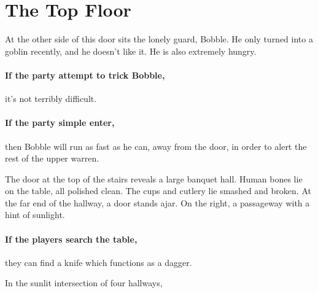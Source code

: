 \section{The Top Floor}
\label{upper}

\setcounter{list}{0}

\begin{multicols}{2}



At the other side of this door sits the lonely guard, Bobble.
He only turned into a goblin recently, and he doesn't like it.
He is also extremely hungry.

\paragraph{If the party attempt to trick Bobble,}
it's not terribly difficult.

\paragraph{If the party simple enter,}
then Bobble will run as fast as he can, away from the door, in order to alert the rest of the upper warren.



\begin{boxtext}

	The door at the top of the stairs reveals a large banquet hall.
	Human bones lie on the table, all polished clean.
	The cups and cutlery lie smashed and broken.
	At the far end of the hallway, a door stands ajar.
	On the right, a passageway with a hint of sunlight.

\end{boxtext}

\paragraph{If the players search the table,}
they can find a knife which functions as a dagger.


\begin{boxtext}

	In the sunlit intersection of four hallways,
	\iftoggle{hardcore}%
		{four ogres sit playing a game of dice.  Two are clad in black leather armour, with a massive sword by their side.
		Another sucks on a horse's uncooked head, while the third goes for a piss behind the staircase.}%
		{three ogres sit playing dice.
		Two are clad in black, leather armour, apparently pieced together from multiple suits.
		The third sits watching them play some dice game.}%


\end{boxtext}
\end{multicols}

